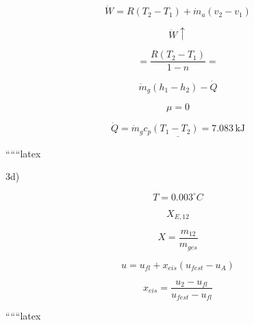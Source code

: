 \[
\dot{W} = R(T_2 - T_1) + \dot{m}_a (v_2 - v_1)
\]

\[
\dot{W} \uparrow
\]

\[
= \frac{R(T_2 - T_1)}{1 - n} = 
\]

\[
\dot{m}_g (h_1 - h_2) - \dot{Q}
\]

\[
\mu = 0
\]

\[
\underline{\dot{Q} = \dot{m}_g c_p (T_1 - T_2) = 7.083 \, \text{kJ}}
\]

``````latex


3d)

\[
T = 0.003^\circ C
\]

\[
X_{E,12}
\]

\[
X = \frac{m_{12}}{m_{ges}}
\]

\[
u = u_{fl} + x_{eis}(u_{fest} - u_A)
\]

\[
x_{eis} = \frac{u_2 - u_{fl}}{u_{fest} - u_{fl}}
\]

``````latex


